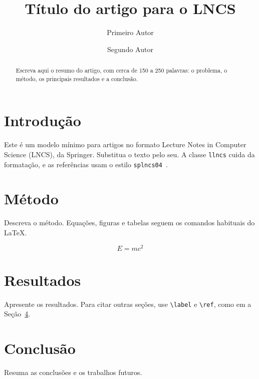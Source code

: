 \documentclass[runningheads]{llncs}
\begin{document}
%
\title{Título do artigo para o LNCS}
%
%
\author{Primeiro Autor \and
Segundo Autor}
%
%
%
\maketitle
%
\begin{abstract}
Escreva aqui o resumo do artigo, com cerca de 150 a 250 palavras: o problema, o método,
os principais resultados e a conclusão.
\end{abstract}

\section{Introdução}
Este é um modelo mínimo para artigos no formato Lecture Notes in Computer Science (LNCS), da Springer.
Substitua o texto pelo seu. A classe \texttt{llncs} cuida da formatação, e as referências usam o estilo
\texttt{splncs04}~\cite{exemplo}.

\section{Método}
Descreva o método. Equações, figuras e tabelas seguem os comandos habituais do \LaTeX.

\begin{equation}
  E = mc^2
\end{equation}

\section{Resultados}
Apresente os resultados. Para citar outras seções, use \verb|\label| e \verb|\ref|, como em
a Seção~\ref{sec:conclusao}.

\section{Conclusão}\label{sec:conclusao}
Resuma as conclusões e os trabalhos futuros.



\end{document}
